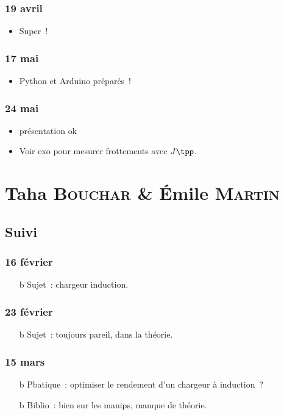 \documentclass[a4paper, 11pt, final, garamond]{book}
\begin{document}
\subsection{19 avril}
\begin{itemize}
	\item Super~!
\end{itemize}

\subsection{17 mai}
\begin{itemize}
	\item Python et Arduino préparés~!
\end{itemize}

\subsection{24 mai}
\begin{itemize}
	\item présentation ok
	\item Voir exo pour mesurer frottements avec $J \tpp$.
\end{itemize}

\chapter{Taha \textsc{Bouchar} \& Émile \textsc{Martin}}
\label{ch:boucharmartin}

\section{Suivi}
\subsection{16 février}
\begin{itemize}
	\item[b]{Sujet}~: chargeur induction.
\end{itemize}

\subsection{23 février}
\begin{itemize}
	\item[b]{Sujet}~: toujours pareil, dans la théorie.
\end{itemize}

\subsection{15 mars}
\begin{itemize}
	\item[b]{Pbatique}~: optimiser le rendement d'un chargeur à induction~?
	\item[b]{Biblio}~: bien sur les manips, manque de théorie.
\end{itemize}
\end{document}
